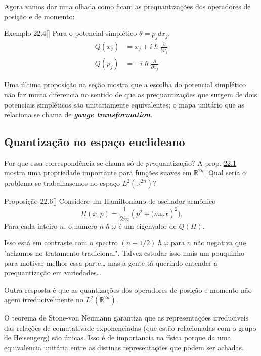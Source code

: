 Agora vamos dar uma olhada como ficam as prequantizações dos operadores de posição e de momento:
\begin{thing4}{Exemplo 22.4}[\cite{hallq}]\leavevmode
	Para o potencial simplético $\theta=p_jdx_j$,
	\begin{align*}
	Q(x_j)&=x_j+i\hslash\frac{\partial }{\partial p_j}\\
	Q(p_j)&=-i\hslash\frac{\partial }{\partial x_j}
	\end{align*}
\end{thing4}

Uma última proposição na seção mostra que a escolha do potencial simplético não faz muita diferencia no sentido de que as prequantizações que surgem de dois potenciais simpléticos são unitariamente equivalentes; o mapa unitário que as relaciona se chama de \textit{\textbf{gauge transformation}}.

\subsection{Quantização no espaço euclideano}

Por que essa correspondência se chama só de \textit{pre}quantização? A prop. \hyperref[prop:22.1]{22.1} mostra uma propriedade importante para funções suaves em $\mathbb{R}^{2n}$. Qual seria o problema se trabalhasemos no espaço $L^2(\mathbb{R}^{2n})$? 
\begin{thing4}{Proposição 22.6}[\cite{hallq}]\leavevmode
	Considere um Hamiltoniano de oscilador armônico
	\[H(x,p)=\frac{1}{2m}(p^2+\Big(m \omega x)^2\Big).\]
	Para cada inteiro $n$, o numero $n\hslash \omega$ é um eigenvalor de $Q(H)$.
\end{thing4}
Isso está em contraste com o spectro $(n+1/2)\hslash \omega$ para $n$  não negativa que "achamos no tratamento tradicional". {\color{2}Talvez estudar isso mais um pouquinho para motivar melhor essa parte… mas a gente tá querindo entender a prequantização em variedades…}

Outra resposta é que as quantizações dos operadores de posição e momento não  agem irreducivelmente no $L^2(\mathbb{R}^{2n})$.

\begin{remark}\leavevmode
	O teorema de Stone-von Neumann garantiza que as representações irreduciveis das relações de comutativade exponenciadas (que estão relacionadas com o grupo de Heisengerg) são únicas. Isso é de importancia na física porque da uma equivalencia unitária entre as distinas representações que podem ser achadas.
\end{remark}

